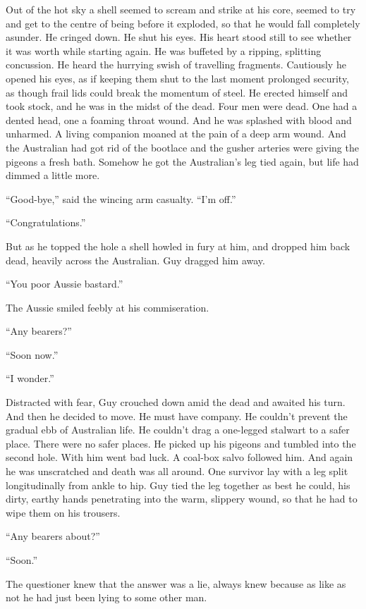 Out of the hot sky a shell seemed to scream and strike at his core, seemed to try and get to the centre of being before it exploded, so that he would fall completely asunder. He cringed down. He shut his eyes. His heart stood still to see whether it was worth while starting again. He was buffeted by a ripping, splitting concussion. He heard the hurrying swish of travelling fragments. Cautiously he opened his eyes, as if keeping them shut to the last moment prolonged security, as though frail lids could break the momentum of steel. He erected himself and took stock, and he was in the midst of the dead. Four men were dead. One had a dented head, one a foaming throat wound. And he was splashed with blood and unharmed. A living companion moaned at the pain of a deep arm wound. And the Australian had got rid of the bootlace and the gusher arteries were giving the pigeons a fresh bath. Somehow he got the Australian's leg tied again, but life had dimmed a little more.

``Good-bye,'' said the wincing arm casualty. ``I'm off.''

``Congratulations.''

But as he topped the hole a shell howled in fury at him, and dropped him back dead, heavily across the Australian. Guy dragged him away.

``You poor Aussie bastard.''

The Aussie smiled feebly at his commiseration.

``Any bearers?''

``Soon now.''

``I wonder.''

Distracted with fear, Guy crouched down amid the dead and awaited his turn. And then he decided to move. He must have company. He couldn't prevent the gradual ebb of Australian life. He couldn't drag a one-legged stalwart to a safer place. There were no safer places. He picked up his pigeons and tumbled into the second hole. With him went bad luck. A coal-box salvo followed him. And again he was unscratched and death was all around. One survivor lay with a leg split longitudinally from ankle to hip. Guy tied the leg together as best he could, his dirty, earthy hands penetrating into the warm, slippery wound, so that he had to wipe them on his trousers.

``Any bearers about?''

``Soon.''

The questioner knew that the answer was a lie, always knew because as like as not he had just been lying to some other man.

